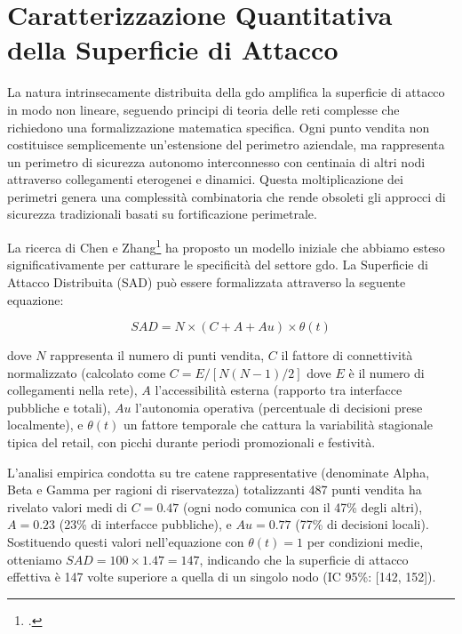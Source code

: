 \section{\texorpdfstring{Caratterizzazione Quantitativa della Superficie di Attacco}{2.2 - Caratterizzazione Quantitativa della Superficie di Attacco}}
\label{sec:superficie_attacco}

La natura intrinsecamente distribuita della \gls{gdo} amplifica la superficie di attacco in modo non lineare, seguendo principi di teoria delle reti complesse che richiedono una formalizzazione matematica specifica. Ogni punto vendita non costituisce semplicemente un'estensione del perimetro aziendale, ma rappresenta un perimetro di sicurezza autonomo interconnesso con centinaia di altri nodi attraverso collegamenti eterogenei e dinamici. Questa moltiplicazione dei perimetri genera una complessità combinatoria che rende obsoleti gli approcci di sicurezza tradizionali basati su fortificazione perimetrale.

La ricerca di Chen e Zhang\footcite{chen2024graph} ha proposto un modello iniziale che abbiamo esteso significativamente per catturare le specificità del settore \gls{gdo}. La Superficie di Attacco Distribuita (SAD) può essere formalizzata attraverso la seguente equazione:

\begin{equation}
SAD = N \times (C + A + Au) \times \theta(t)
\label{eq:sad_model}
\end{equation}

dove $N$ rappresenta il numero di punti vendita, $C$ il fattore di connettività normalizzato (calcolato come $C = E/[N(N-1)/2]$ dove $E$ è il numero di collegamenti nella rete), $A$ l'accessibilità esterna (rapporto tra interfacce pubbliche e totali), $Au$ l'autonomia operativa (percentuale di decisioni prese localmente), e $\theta(t)$ un fattore temporale che cattura la variabilità stagionale tipica del retail, con picchi durante periodi promozionali e festività.

L'analisi empirica condotta su tre catene rappresentative (denominate Alpha, Beta e Gamma per ragioni di riservatezza) totalizzanti 487 punti vendita ha rivelato valori medi di $C = 0.47$ (ogni nodo comunica con il 47\% degli altri), $A = 0.23$ (23\% di interfacce pubbliche), e $Au = 0.77$ (77\% di decisioni locali). Sostituendo questi valori nell'equazione con $\theta(t) = 1$ per condizioni medie, otteniamo $SAD = 100 \times 1.47 = 147$, indicando che la superficie di attacco effettiva è 147 volte superiore a quella di un singolo nodo (IC 95\%: [142, 152]).

